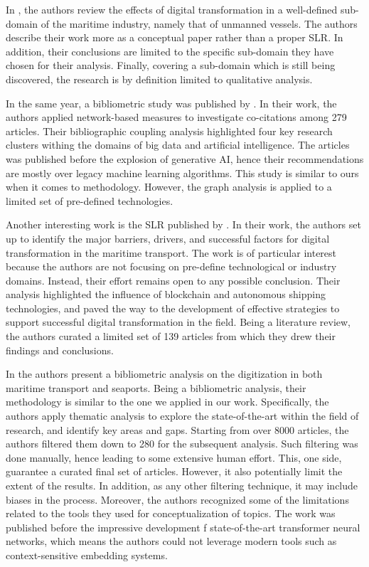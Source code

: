 \documentclass[jmse,review,submit,pdftex,moreauthors]{Definitions/mdpi}
\begin{document}
In \citep{poulis2020value}, the authors review the effects of digital transformation in a well-defined sub-domain of the maritime industry, namely that of unmanned vessels. The authors describe their work more as a conceptual paper rather than a proper SLR. In addition, their conclusions are limited to the specific sub-domain they have chosen for their analysis. Finally, covering a sub-domain which is still being discovered, the research is by definition limited to qualitative analysis.

In the same year, a bibliometric study was published by \citep{munim2020big}. In their work, the authors applied network-based measures to investigate co-citations among 279 articles. Their bibliographic coupling analysis highlighted four key research clusters withing the domains of big data and artificial intelligence. The articles was published before the explosion of generative AI, hence their recommendations are mostly over legacy machine learning algorithms. This study is similar to ours when it comes to methodology. However, the graph analysis is applied to a limited set of pre-defined technologies.

Another interesting work is the SLR published by \citep{tijan2021digital}. In their work, the authors set up to identify the major barriers, drivers, and successful factors for digital transformation in the maritime transport. The work is of particular interest because the authors are not focusing on pre-define technological or industry domains. Instead, their effort remains open to any possible conclusion. Their analysis highlighted the influence of blockchain and autonomous shipping technologies, and paved the way to the development of effective strategies to support successful digital transformation in the field. Being a literature review, the authors curated a limited set of 139 articles from which they drew their findings and conclusions.

In \citep{jovic2022digitalization} the authors present a bibliometric analysis on the digitization in both maritime transport and seaports. Being a bibliometric analysis, their methodology is similar to the one we applied in our work. Specifically, the authors apply thematic analysis to explore the state-of-the-art within the field of research, and identify key areas and gaps. Starting from over 8000 articles, the authors filtered them down to 280 for the subsequent analysis. Such filtering was done manually, hence leading to some extensive human effort. This, one side, guarantee a curated final set of articles. However, it also potentially limit the extent of the results. In addition, as any other filtering technique, it may include biases in the process. Moreover, the authors recognized some of the limitations related to the tools they used for conceptualization of topics. The work was published before the impressive development f state-of-the-art transformer neural networks, which means the authors could not leverage modern tools such as context-sensitive embedding systems.
\end{document}
